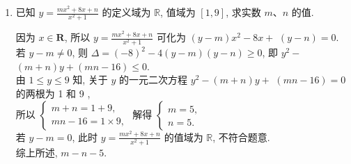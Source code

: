 \begin{enumerate}
\begin{jieda}
\begin{enumerate}
\item 当$x>1$时, $y=\sqrt{\dfrac{x^2+1}{x^2-2x+1}}=\sqrt{1+\dfrac{2x}{x^2-2x+1}}=\sqrt{1+\dfrac{2}{x+\frac{1}{x}-2}}\in(1,+\infty)$. \\
当$x<1$时, $y=-\sqrt{\dfrac{x^2+1}{x^2-2x+1}}=-\sqrt{1+\dfrac{2x}{x^2-2x+1}}$. \\
再分为$(-\infty,0)\cup\{0\}\cup(0,1)$讨论可得$y\in(-\infty,-\frac{1}{\sqrt{2}}]$. \\
综上, $y\in(-\infty,-\frac{1}{\sqrt{2}}]\cup(1,+\infty)$. \\
\ps 可化为$ax+\frac{b}{x}$的. \\
\ps 对于$f(x)=\dfrac{x}{x^2+1}$而言, 在$(-\infty,-1]$上$\searrow$, 在$[-1,1]$上$\nearrow$, 在$[1,+\infty)$上$\searrow$. \\
\ps 三角换元: 令$x=\tan\theta$, 其中$\theta\in(-\frac{\pi}{2},\frac{\pi}{4})\cup(\frac{\pi}{4},\frac{\pi}{2})$. \\
于是$y=\dfrac{\sec\theta}{\tan\theta-1}=\dfrac{1}{\sin\theta-\cos\theta}=\dfrac{1}{\sqrt{2}\sin(\theta-\frac{\pi}{4})}$. %
\end{enumerate}
\end{jieda}
\begin{vspace_}
\vsp[6]
\end{vspace_}

\item 已知 $y=\frac{m x^2+8 x+n}{x^2+1}$ 的定义域为 $\mathbb{R}$, 值域为 $[1,9]$, 求实数 $m 、 n$ 的值.
\begin{jieda}
因为 $x \in \mathbf{R}$, 所以 $y=\frac{m x^2+8 x+n}{x^2+1}$ 可化为 $(y-m) x^2-8 x+$ $(y-n)=0$.\\
若 $y-m \neq 0$, 则 $\Delta=(-8)^2-4(y-m)(y-n) \geqslant 0$, 即 $y^2-$ $(m+n) y+(m n-16) \leqslant 0$.\\
由 $1 \leqslant y \leqslant 9$ 知, 关于 $y$ 的一元二次方程 $y^2-(m+n) y+$ $(m n-16)=0$ 的两根为 1 和 9 ,\\
所以 $\left\{\begin{array}{l}m+n=1+9, \\ m n-16=1 \times 9,\end{array}\right.$ 解得 $\left\{\begin{array}{l}m=5, \\ n=5 .\end{array}\right.$\\
若 $y-m=0$, 此时 $y=\frac{m x^2+8 x+n}{x^2+1}$ 的值域为 $\mathbb{R}$, 不符合题意.\\
综上所述, $m-n-5$.
\end{jieda}
\begin{vspace_}
\vsp[5]
\end{vspace_}



\end{enumerate}
